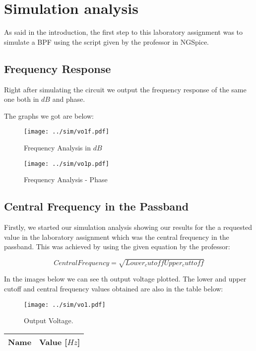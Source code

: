 \section{Simulation analysis}
\label{sec:simulation}
As said in the introduction, the first step to this laboratory assignment was to simulate a BPF using the script given by the professor in NGSpice.

\subsection{Frequency Response}
Right after simulating the circuit we output the frequency response of the same one both in $dB$ and phase. \par
The graphs we got are below: \par

\begin{figure}[H] \centering
\texttt{[image: ../sim/vo1f.pdf]}
\caption{Frequency Analysis in $dB$}
\label{fig:frequency1}
\end{figure}

\begin{figure}[H] \centering
\texttt{[image: ../sim/vo1p.pdf]}
\caption{Frequency Analysis - Phase}
\label{fig:frequency2}
\end{figure}

\subsection{Central Frequency in the Passband}
Firstly, we started our simulation analysis showing our results for the a requested value in the laboratory assignment which was the central frequency in the passband. This was achieved by using the given equation by the professor: \par
\begin{equation}
    CentralFrequency = \sqrt{Lower_cutoff Upper_cuttoff}
\end{equation}\par
In the images below we can see th output voltage plotted. The lower and upper cutoff and central frequency values obtained are also in the table below:

\begin{figure}[H] \centering
\texttt{[image: ../sim/vo1.pdf]}
\caption{Output Voltage.}
\label{fig:output}
\end{figure}

\begin{table}[H]
  \centering
  \begin{tabular}{|l|r|}
    \hline    
    {\bf Name} & {\bf Value [$Hz$]} \\ \hline
    
  \end{tabular}
  \label{tab:central}
\end{table}

